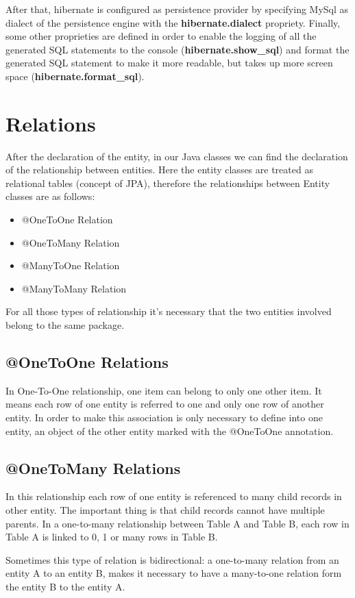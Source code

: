 \documentclass[a4paper]{article}
\begin{document}
After that, hibernate is configured as persistence provider by specifying MySql as dialect of the persistence engine with the \textbf{hibernate.dialect} propriety. Finally, some other proprieties are defined in order to enable the logging of all the generated SQL statements to the console (\textbf{hibernate.show\_sql}) and format the generated SQL statement to make it more readable, but takes up more screen space (\textbf{hibernate.format\_sql}).

\section{Relations}
After the declaration of the entity, in our Java classes we can find the declaration of the relationship between entities. Here the entity classes are treated as relational tables (concept of JPA), therefore the relationships between Entity classes are as follows:

\begin{itemize}
\item{@OneToOne Relation}
\item{@OneToMany Relation}
\item{@ManyToOne Relation}
\item{@ManyToMany Relation}
\end{itemize}
For all those types of relationship it's necessary that the two entities involved belong to the same package.

\subsection{@OneToOne Relations}
In One-To-One relationship, one item can belong to only one other item. It means each row of one entity is referred to one and only one row of another entity. In order to make this association is only necessary to define into one entity, an object of the other entity marked with the @OneToOne annotation.

\subsection{@OneToMany Relations}
In this relationship each row of one entity is referenced to many child records in other entity. The important thing is that child records cannot have multiple parents. In a one-to-many relationship between Table A and Table B, each row in Table A is linked to 0, 1 or many rows in Table B.

Sometimes this type of relation is bidirectional: a one-to-many relation from an entity A to an entity B, makes it necessary to have a many-to-one relation form the entity B to the entity A.
\end{document}
